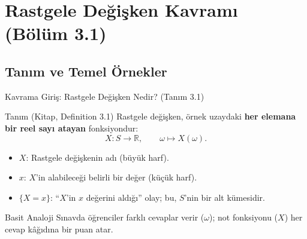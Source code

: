 \documentclass[light]{lutbeamer}
\begin{document}
\section{Rastgele Değişken Kavramı (Bölüm 3.1)}
\subsection{Tanım ve Temel Örnekler}

\begin{frame}{Kavrama Giriş: Rastgele Değişken Nedir? (Tanım 3.1)}
    \begin{block}{Tanım (Kitap, Definition 3.1)}
        Rastgele değişken, örnek uzaydaki \textbf{her elemana bir reel sayı atayan} fonksiyondur:
        \[
        X : S \to \mathbb{R}, \qquad \omega \mapsto X(\omega).
        \]
    \end{block}

    \begin{itemize}
        \item $X$: Rastgele değişkenin adı (büyük harf).
        \item $x$: $X$'in alabileceği belirli bir değer (küçük harf).
        \item $\{X = x\}$: ``$X$'in $x$ değerini aldığı'' olay; bu, $S$'nin bir alt kümesidir.
    \end{itemize}

    \begin{exampleblock}{Basit Analoji}
      Sınavda öğrenciler farklı cevaplar verir ($\omega$); not fonksiyonu ($X$) her cevap kâğıdına bir puan atar.
    \end{exampleblock}
\end{frame}
\end{document}
